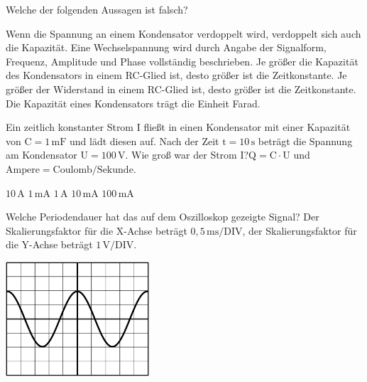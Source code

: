 \documentclass[11pt]{exam}
\begin{document}
\setlength{\voffset}{-0.5in}
\setlength{\headsep}{5pt}

\hspace{2mm}
 \hspace{5mm}
\vspace{4mm}

\begin{questions}

\question Welche der folgenden Aussagen ist falsch?

\begin{choices}
	\choice Wenn die Spannung an einem Kondensator verdoppelt wird, verdoppelt sich auch die Kapazität.
	\choice Eine Wechselspannung wird durch Angabe der Signalform, Frequenz, Amplitude und Phase vollständig beschrieben.
	\choice Je größer die Kapazität des Kondensators in einem RC-Glied ist, desto größer ist die Zeitkonstante.
	\choice Je größer der Widerstand in einem RC-Glied ist, desto größer ist die Zeitkonstante.
	\choice Die Kapazität eines Kondensators trägt die Einheit Farad.
\end{choices}

\vspace{3mm}\question Ein zeitlich konstanter Strom \(\mathrm{I}\) fließt in einen Kondensator mit einer Kapazität von \(\mathrm{C=1\,mF}\) und lädt diesen auf. Nach der Zeit \(\mathrm{t=10\,s}\) beträgt die Spannung am Kondensator \(\mathrm{U=100\,V}\). Wie groß war der Strom \(\mathrm{I}\)?\(\mathrm{Q=C \cdot U}\) und \(\mathrm{Ampere=Coulomb/Sekunde}\).

\begin{choices}
	\choice \(\mathrm{10\,A}\)
	\choice \(\mathrm{1\,mA}\)
	\choice \(\mathrm{1\,A}\)
	\choice \(\mathrm{10\,mA}\)
	\choice \(\mathrm{100\,mA}\)
\end{choices}

\vspace{3mm}\question Welche Periodendauer hat das auf dem Oszilloskop gezeigte Signal? Der Skalierungsfaktor für die X-Achse beträgt \(\mathrm{0,5\,ms/DIV}\), der Skalierungsfaktor für die Y-Achse beträgt \(\mathrm{1\,V/DIV}\). 

\includegraphics[width=0.4\textwidth]{images/Oszi2.png}


\end{questions}
\end{document}
